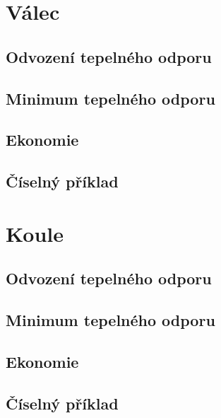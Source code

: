 \documentclass{article}
\begin{document}



\maketitle
\tableofcontents
\newpage



\section{Válec \spicy \spicy \spicy}


\subsection{Odvození tepelného odporu}


\subsection{Minimum tepelného odporu}


\subsection{Ekonomie}


\subsection{Číselný příklad \spicy \spicy}



\section{Koule \spicy \spicy \spicy}


\subsection{Odvození tepelného odporu}


\subsection{Minimum tepelného odporu}


\subsection{Ekonomie}


\subsection{Číselný příklad}
\end{document}
